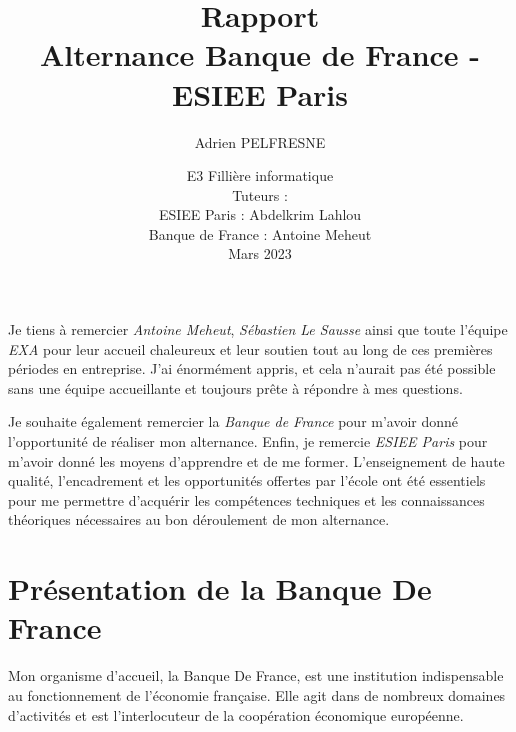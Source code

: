 \documentclass{report}
\title{Rapport \\ Alternance Banque de France - ESIEE Paris}
\author{Adrien PELFRESNE}
\date{
E3 Fillière informatique \\
Tuteurs : \\
ESIEE Paris : Abdelkrim Lahlou \\
Banque de France : Antoine Meheut \\ %
Mars 2023
}
\begin{document}
\maketitle

Je tiens à remercier \emph{Antoine Meheut}, \emph{Sébastien Le Sausse} ainsi que toute l'équipe \emph{EXA} pour leur accueil chaleureux et leur soutien tout au long de ces premières périodes en entreprise. J'ai énormément appris, et cela n'aurait pas été possible sans une équipe accueillante et toujours prête à répondre à mes questions.

Je souhaite également remercier la \emph{Banque de France} pour m'avoir donné l'opportunité de réaliser mon alternance.
Enfin, je remercie \emph{ESIEE Paris} pour m'avoir donné les moyens d'apprendre et de me former. L'enseignement de haute qualité, l'encadrement et les opportunités offertes par l'école ont été essentiels pour me permettre d'acquérir les compétences techniques et les connaissances théoriques nécessaires au bon déroulement de mon alternance.

\tableofcontents

\chapter{Présentation de la Banque De France}
Mon organisme d'accueil, la Banque De France, est une institution indispensable au fonctionnement de l'économie française. Elle agit dans de nombreux domaines d'activités et est l'interlocuteur de la coopération économique européenne.
\end{document}
